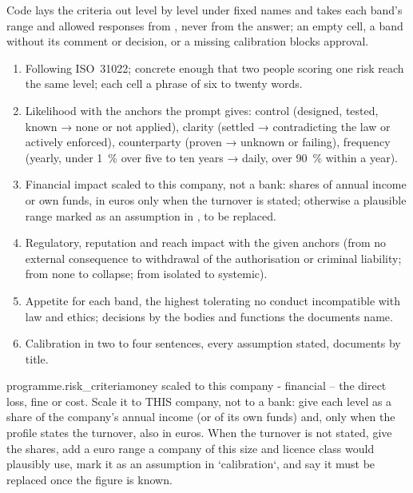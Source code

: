 Code lays the criteria out level by level under fixed names and takes each band's range and
allowed responses from , never from the answer; an empty cell, a band without its
comment or decision, or a missing calibration blocks approval.

\begin{enumerate}[itemsep=1pt, topsep=3pt]
  \item Following ISO~31022; concrete enough that two people scoring one risk reach the same
    level; each cell a phrase of six to twenty words.
  \item Likelihood with the anchors the prompt gives: control (designed, tested, known → none
    or not applied), clarity (settled → contradicting the law or actively enforced),
    counterparty (proven → unknown or failing), frequency (yearly, under 1~\% over five to ten
    years → daily, over 90~\% within a year).
  \item Financial impact scaled to this company, not a bank: shares of annual income or own
    funds, in euros only when the turnover is stated; otherwise a plausible range marked as an
    assumption in , to be replaced.
  \item Regulatory, reputation and reach impact with the given anchors (from no external
    consequence to withdrawal of the authorisation or criminal liability; from none to
    collapse; from isolated to systemic).
  \item Appetite for each band, the highest tolerating no conduct incompatible with law and
    ethics; decisions by the bodies and functions the documents name.
  \item Calibration in two to four sentences, every assumption stated, documents by title.
\end{enumerate}

\par\nopagebreak
\begin{promptexcerpt}{programme.risk_criteria}{money scaled to this company}
- financial – the direct loss, fine or cost. Scale it to THIS company, not to a bank: give each level as a share of the company's annual income (or of its own funds) and, only when the profile states the turnover, also in euros. When the turnover is not stated, give the shares, add a euro range a company of this size and licence class would plausibly use, mark it as an assumption in `calibration`, and say it must be replaced once the figure is known.
\end{promptexcerpt}

